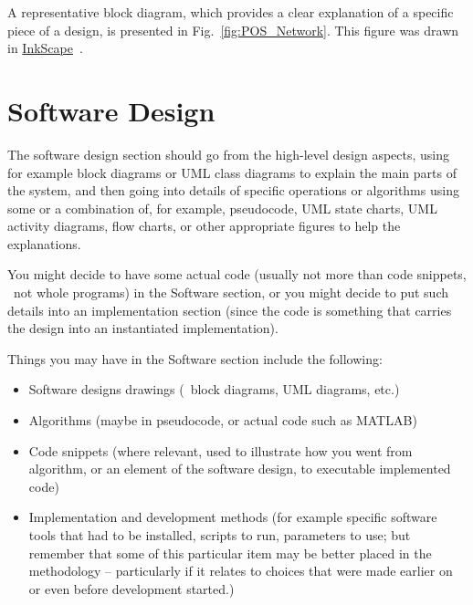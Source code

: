 A representative block diagram, which provides a clear explanation of a specific piece of a design, is presented in Fig.~\ref{fig:POS_Network}.  This figure was drawn in \href{http://www.inkscape.org/}{InkScape}~\cite{InkScape}.



\section{Software Design}

The software design section should go from the high-level design aspects, using for example block diagrams or UML class diagrams to explain the main parts of the system, and then going into details of specific operations or algorithms using some or a combination of, for example, pseudocode, UML state charts, UML activity diagrams, flow charts, or other appropriate figures to help the explanations.

You might decide to have some actual code (usually not more than code snippets, \ie~not whole programs) in the Software section, or you might decide to put such details into an implementation section (since the code is something that carries the design into an instantiated implementation).

Things you may have in the Software section include the following:

\begin{itemize}
  \item Software designs drawings (\eg~block diagrams, UML diagrams, etc.)
  \item Algorithms (maybe in pseudocode, or actual code such as MATLAB)
  \item Code snippets (where relevant, used to illustrate how you went from algorithm, or an element of the software design, to executable implemented code)
  \item Implementation and development methods (for example specific software tools that had to be installed, scripts to run, parameters to use; but remember that some of this particular item may be better placed in the methodology -- particularly if it relates to choices that were made earlier on or even before development started.)
\end{itemize}

